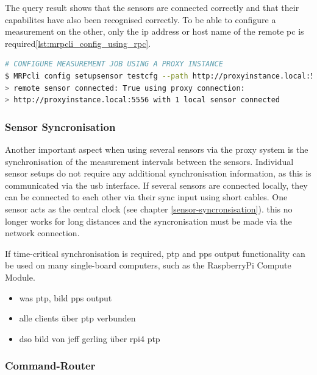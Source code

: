 The query result shows that the sensors are connected correctly and that
their capabilites have also been recognised correctly. To be able to
configure a measurement on the other, only the \gls{ip} address or host
name of the remote \gls{pc} is
required\ref{lst:mrpcli_config_using_rpc}.

\begin{lstlisting}[language=bash, caption={MRPcli usage example to connect with a network sensor}, label=lst:mrpcli_config_using_rpc]
# CONFIGURE MEASUREMENT JOB USING A PROXY INSTANCE
$ MRPcli config setupsensor testcfg --path http://proxyinstance.local:5556
> remote sensor connected: True using proxy connection:
> http://proxyinstance.local:5556 with 1 local sensor connected
\end{lstlisting}

\hypertarget{sensor-syncronisation}{%
\subsubsection{Sensor Syncronisation}\label{sensor-syncronisation}}

Another important aspect when using several sensors via the proxy system
is the synchronisation of the measurement intervals between the sensors.
Individual sensor setups do not require any additional synchronisation
information, as this is communicated via the \gls{usb} interface. If
several sensors are connected locally, they can be connected to each
other via their sync input using short cables. One sensor acts as the
central clock (see chapter \ref{sensor-syncronsisation}). this no longer
works for long distances and the syncronisation must be made via the
network connection.

If time-critical synchronisation is required, \gls{ptp} and \gls{pps}
output functionality can be used on many single-board computers, such as
the RaspberryPi Compute Module.

\begin{itemize}
\tightlist
\item
  was ptp, bild pps output
\item
  alle clients über ptp verbunden
\item
  dso bild von jeff gerling über rpi4 ptp
\end{itemize}

\hypertarget{command-router}{%
\subsubsection{Command-Router}\label{command-router}}

